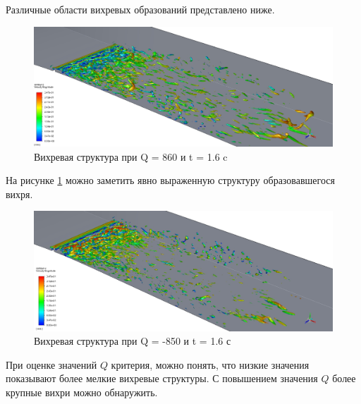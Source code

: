 	Различные области вихревых образований представлено ниже.
	\begin{figure}[H]
		\centering
		\includegraphics[width=1\linewidth]{../Assets/Q860-t16}
		\caption{Вихревая структура при Q = 860 и t = 1.6 c}
		\label{fig:q860-t16}
	\end{figure}
	На рисунке \ref{fig:q860-t16} можно заметить явно выраженную структуру образовавшегося вихря. 
	\begin{figure}[H]
		\centering
		\includegraphics[width=1\linewidth]{../Assets/QM850-t16}
		\caption{Вихревая структура при Q = -850 и t = 1.6 с}
		\label{fig:qm850-t16}
	\end{figure}
	При оценке значений $Q$ критерия, можно понять, что низкие значения показывают более мелкие вихревые структуры. С повышением значения $Q$ более крупные вихри можно обнаружить.
	\nocite{KimW.W.1995,Agostini2014,Blackwelder1983,Abbas2017,Лаптева2013,Мазо2007,Корнев2005}
